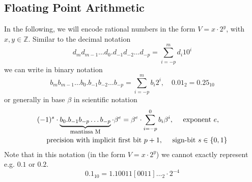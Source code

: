 \subsection{Floating Point Arithmetic}
In the following, we will encode rational numbers in the form $V = x \cdot 2^y$, with $x,y \in \mathbb{Z}$. Similar to the decimal notation
\begin{equation}
    d_m d_{m-1} \dots d_0 . d_{-1} d_{-2} \dots d_{-p} = \sum_{i=-p}^m d_i 10^i
\end{equation}
we can write in binary notation
\begin{equation}
    b_m b_{m-1} \dots b_0 . b_{-1} b_{-2} \dots b_{-p} = \sum_{i=-p}^m b_i 2^i, \quad 0.01_2 = 0.25_{10}
\end{equation}
or generally in base $\beta$ in scientific notation
\begin{equation}
    \begin{multlined}
        (-1) ^ s \cdot \explain{b_0 . b_{-1} b_{-p} \dots b_{-p}}{mantissa M} \cdot \beta^e = \beta^e \cdot \sum_{i=-p}^0 b_i \beta^i, \quad \text{ exponent } e,\\ \text{ precision with implicit first bit } p+1, \quad \text{ sign-bit } s \in \{0,1\}
    \end{multlined}
\end{equation}
Note that in this notation (in the form $V = x \cdot 2^y$) we cannot exactly represent e.g. $0.1$ or $0.2$.
\begin{equation}
    0.1_{10} = 1.10011[0011]\dots_2 \cdot 2^{-4}
\end{equation}

